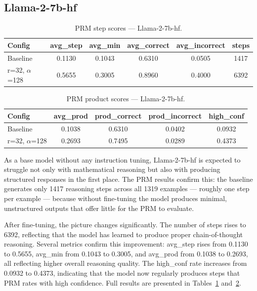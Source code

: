  \subsection{Llama-2-7b-hf}
\begin{table}[ht]
  \caption{PRM step scores --- Llama-2-7b-hf.}
  \centering
  \footnotesize
  \begin{tabular}{lccccc}
  \toprule
  \textbf{Config} & \textbf{avg\_step} & \textbf{avg\_min} & \textbf{avg\_correct} & \textbf{avg\_incorrect} & \textbf{steps} \\
  \midrule
  Baseline           & 0.1130 & 0.1043 & 0.6310 & 0.0505 & 1417 \\
  r=32, $\alpha$=128 & 0.5655 & 0.3005 & 0.8960 & 0.4000 & 6392 \\
  \bottomrule
  \end{tabular}

  \label{tab:prm-llama-hf-1}
  \end{table}

  \begin{table}[ht]
  \caption{PRM product scores --- Llama-2-7b-hf.}
  \centering
  \footnotesize
  \begin{tabular}{lcccc}
  \toprule
  \textbf{Config} & \textbf{avg\_prod} & \textbf{prod\_correct} & \textbf{prod\_incorrect} & \textbf{high\_conf} \\
  \midrule
  Baseline           & 0.1038 & 0.6310 & 0.0402 & 0.0932 \\
  r=32, $\alpha$=128 & 0.2693 & 0.7495 & 0.0289 & 0.4373 \\
  \bottomrule
  \end{tabular}

  \label{tab:prm-llama-hf-2}
  \end{table}
As a base model without any instruction tuning,
  Llama-2-7b-hf is expected to struggle not only
  with mathematical reasoning but also with producing
  structured responses in the first place. The PRM
  results confirm this: the baseline generates only
  1417 reasoning steps across all 1319 examples ---
  roughly one step per example --- because without
  fine-tuning the model produces minimal,
  unstructured outputs that offer little for the
  PRM to evaluate.

  After fine-tuning, the picture changes
  significantly. The number of steps rises to 6392,
  reflecting that the model has learned to produce
  proper chain-of-thought reasoning. Several metrics confirm this improvement:
  avg\_step rises from 0.1130 to 0.5655, avg\_min
  from 0.1043 to 0.3005, and avg\_prod from 0.1038
  to 0.2693, all reflecting higher overall
  reasoning quality. The high\_conf rate increases
  from 0.0932 to 0.4373, indicating that the model
  now regularly produces steps that PRM rates with
  high confidence. Full
  results are presented in
  Tables~\ref{tab:prm-llama-hf-1}
  and~\ref{tab:prm-llama-hf-2}.

